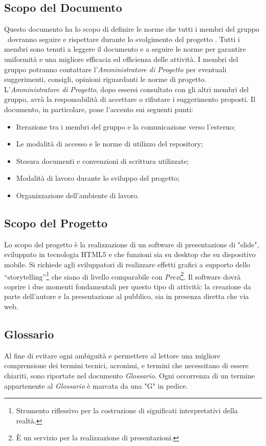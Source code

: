 	\subsection{Scopo del Documento}
Questo documento ha lo scopo di definire le norme che tutti i membri del gruppo \GRUPPO\ dovranno seguire e rispettare durante lo svolgimento del progetto \PROGETTO. Tutti i membri sono tenuti a leggere il documento e a seguire le norme per garantire uniformità e una migliore efficacia ed efficienza delle attività.
I membri del gruppo potranno contattare l'\textit{Amministratore di Progetto} per eventuali suggerimenti, consigli, opinioni riguardanti le norme di progetto. 
L'\textit{Amministratore di Progetto}, dopo essersi consultato con gli altri membri del gruppo, avrà la responsabilità di accettare o rifiutare i suggerimento proposti. 
Il documento, in particolare, pone l'accento sui seguenti punti:

\begin{itemize}
	\item Iterazione tra i membri del gruppo e la comunicazione verso l'esterno;
	\item Le modalità di accesso e le norme di utilizzo del \gls{repository};
	\item Stesura documenti e convenzioni di scrittura utilizzate;
	\item Modalità di lavoro durante lo sviluppo del progetto;
	\item Organizzazione dell'ambiente di lavoro.
\end{itemize}

\subsection{Scopo del Progetto}
Lo scopo del progetto è la realizzazione di un software di presentazione di "slide", sviluppato in tecnologia \gls{HTML5} e che funzioni sia su desktop che su dispositivo mobile.
Si richiede agli sviluppatori di realizzare effetti grafici a supporto dello “storytelling”\footnote{Strumento riflessivo per la costruzione di significati interpretativi della realtà.} che siano di livello comparabile con \textit{Prezi}\footnote{È un servizio per la realizzazione di presentazioni.}.
Il software dovrà coprire i due momenti fondamentali per questo tipo di attività: la creazione da parte dell'autore e la presentazione al pubblico, sia in presenza diretta che via web.

\subsection{Glossario}
Al fine di evitare ogni ambiguità e permettere al lettore una migliore comprensione dei termini tecnici, acronimi, e termini che necessitano di essere chiariti,  sono riportate nel documento \textit{Glossario}. 
Ogni occorrenza  di un termine appartenente al \textit{Glossario} è marcata da una "G" in pedice.

